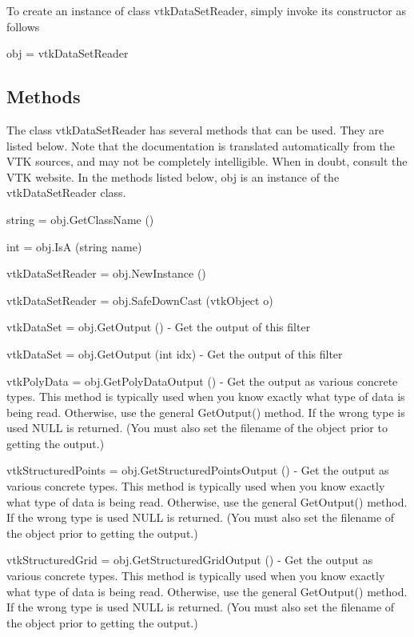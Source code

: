 To create an instance of class vtk\-Data\-Set\-Reader, simply invoke its constructor as follows \begin{DoxyVerb}  obj = vtkDataSetReader
\end{DoxyVerb}
 \hypertarget{vtkwidgets_vtkxyplotwidget_Methods}{}\subsection{Methods}\label{vtkwidgets_vtkxyplotwidget_Methods}
The class vtk\-Data\-Set\-Reader has several methods that can be used. They are listed below. Note that the documentation is translated automatically from the V\-T\-K sources, and may not be completely intelligible. When in doubt, consult the V\-T\-K website. In the methods listed below, {\ttfamily obj} is an instance of the vtk\-Data\-Set\-Reader class. 
\begin{DoxyItemize}
\item {\ttfamily string = obj.\-Get\-Class\-Name ()}  
\item {\ttfamily int = obj.\-Is\-A (string name)}  
\item {\ttfamily vtk\-Data\-Set\-Reader = obj.\-New\-Instance ()}  
\item {\ttfamily vtk\-Data\-Set\-Reader = obj.\-Safe\-Down\-Cast (vtk\-Object o)}  
\item {\ttfamily vtk\-Data\-Set = obj.\-Get\-Output ()} -\/ Get the output of this filter  
\item {\ttfamily vtk\-Data\-Set = obj.\-Get\-Output (int idx)} -\/ Get the output of this filter  
\item {\ttfamily vtk\-Poly\-Data = obj.\-Get\-Poly\-Data\-Output ()} -\/ Get the output as various concrete types. This method is typically used when you know exactly what type of data is being read. Otherwise, use the general Get\-Output() method. If the wrong type is used N\-U\-L\-L is returned. (You must also set the filename of the object prior to getting the output.)  
\item {\ttfamily vtk\-Structured\-Points = obj.\-Get\-Structured\-Points\-Output ()} -\/ Get the output as various concrete types. This method is typically used when you know exactly what type of data is being read. Otherwise, use the general Get\-Output() method. If the wrong type is used N\-U\-L\-L is returned. (You must also set the filename of the object prior to getting the output.)  
\item {\ttfamily vtk\-Structured\-Grid = obj.\-Get\-Structured\-Grid\-Output ()} -\/ Get the output as various concrete types. This method is typically used when you know exactly what type of data is being read. Otherwise, use the general Get\-Output() method. If the wrong type is used N\-U\-L\-L is returned. (You must also set the filename of the object prior to getting the output.)  

\end{DoxyItemize}

